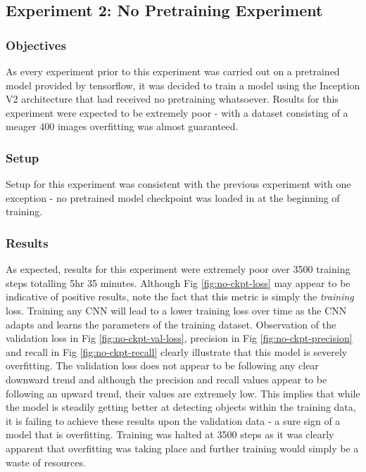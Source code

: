 \documentclass[12pt]{report}
\begin{document}
\clearpage
\subsection{Experiment 2: No Pretraining Experiment}
\subsubsection{Objectives}
\begin{flushleft}
As every experiment prior to this experiment was carried out on a pretrained model provided by tensorflow, it was decided to train a model using the Inception V2 architecture that had received no pretraining whatsoever. Results for this experiment were expected to be extremely poor - with a dataset consisting of a meager 400 images overfitting was almost guaranteed.
\end{flushleft}

\subsubsection{Setup}
\begin{flushleft}
Setup for this experiment was consistent with the previous experiment with one exception - no pretrained model checkpoint was loaded in at the beginning of training.
\end{flushleft}

\newpage
\subsubsection{Results}
\begin{flushleft}
As expected, results for this experiment were extremely poor over 3500 training steps totalling 5hr 35 minutes. Although Fig \ref{fig:no-ckpt-loss} may appear to be indicative of positive results, note the fact that this metric is simply the \textit{training} loss. Training any CNN will lead to a lower training loss over time as the CNN adapts and learns the parameters of the training dataset. Observation of the validation loss in Fig \ref{fig:no-ckpt-val-loss}, precision in Fig \ref{fig:no-ckpt-precision} and recall in Fig \ref{fig:no-ckpt-recall} clearly illustrate that this model is severely overfitting. The validation loss does not appear to be following any clear downward trend and although the precision and recall values appear to be following an upward trend, their values are extremely low. This implies that while the model is steadily getting better at detecting objects within the training data, it is failing to achieve these results upon the validation data - a sure sign of a model that is overfitting. Training was halted at 3500 steps as it was clearly apparent that overfitting was taking place and further training would simply be a waste of resources.
\end{flushleft}
\end{document}
